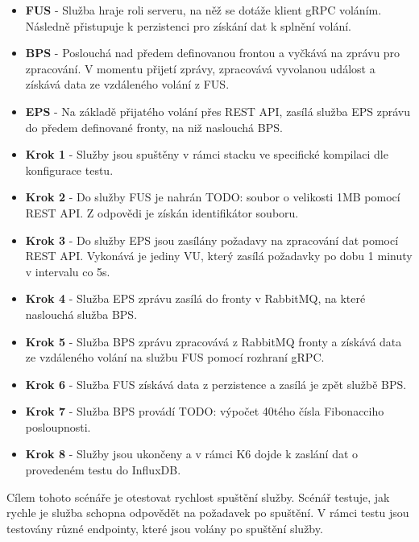 \begin{itemize}
    \item \textbf{FUS} - Služba hraje roli serveru, na něž se dotáže klient gRPC voláním. Následně přistupuje k perzistenci pro získání dat k splnění volání.
    \item \textbf{BPS} - Poslouchá nad předem definovanou frontou a vyčkává na zprávu pro zpracování. V momentu přijetí zprávy, zpracovává vyvolanou událost a získává data ze vzdáleného volání z FUS.
    \item \textbf{EPS} - Na základě přijatého volání přes REST API, zasílá služba EPS zprávu do předem definované fronty, na niž naslouchá BPS.
\end{itemize}


\begin{itemize}
    \item \textbf{Krok 1} - Služby jsou spuštěny v rámci stacku ve specifické kompilaci dle konfigurace testu.
    \item \textbf{Krok 2} - Do služby FUS je nahrán TODO: soubor o velikosti 1MB pomocí REST API. Z odpovědi je získán identifikátor souboru.
    \item \textbf{Krok 3} - Do služby EPS jsou zasílány požadavy na zpracování dat pomocí REST API. Vykonává je jediny VU, který zasílá požadavky po dobu 1 minuty v intervalu co 5s.
    \item \textbf{Krok 4} - Služba EPS zprávu zasílá do fronty v RabbitMQ, na které naslouchá služba BPS. 
    \item \textbf{Krok 5} - Služba BPS zprávu zpracovává z RabbitMQ fronty a získává data ze vzdáleného volání na službu FUS pomocí rozhraní gRPC. 
    \item \textbf{Krok 6} - Služba FUS získává data z perzistence a zasílá je zpět službě BPS. 
    \item \textbf{Krok 7} - Služba BPS provádí TODO: výpočet 40tého čísla Fibonacciho posloupnosti.
    \item \textbf{Krok 8} - Služby jsou ukončeny a v rámci K6 dojde k zaslání dat o provedeném testu do InfluxDB.
\end{itemize}


Cílem tohoto scénáře je otestovat rychlost spuštění služby. Scénář testuje, jak rychle je služba schopna odpovědět na požadavek po spuštění. V rámci testu jsou testovány různé endpointy, které jsou volány po spuštění služby.

